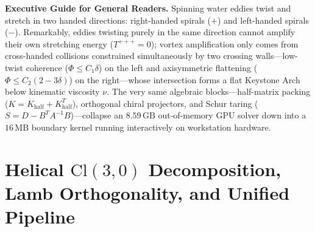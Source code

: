 \documentclass[10pt]{article}
\renewcommand{\_}{\OrigUnderscore\hspace{0pt}}
\numberwithin{equation}{section}
\newcommand{\Cl}{\mathrm{Cl}}
\begin{document}
\noindent\textbf{Executive Guide for General Readers.}
Spinning water eddies twist and stretch in two handed directions: right-handed spirals ($+$) and left-handed spirals ($-$). Remarkably, eddies twisting purely in the same direction cannot amplify their own stretching energy ($T^{+++} = 0$); vortex amplification only comes from cross-handed collisions constrained simultaneously by two crossing walls—low-twist coherence ($\Phi \le C_1\delta$) on the left and axisymmetric flattening ($\Phi \le C_2(2-3\delta)$) on the right—whose intersection forms a flat Keystone Arch below kinematic viscosity $\nu$. The very same algebraic blocks—half-matrix packing ($K = K_{\mathrm{half}} + K_{\mathrm{half}}^T$), orthogonal chiral projectors, and Schur taring ($S = D - B^T A^{-1} B$)—collapse an $8.59\,\mathrm{GB}$ out-of-memory GPU solver down into a $16\,\mathrm{MB}$ boundary kernel running interactively on workstation hardware.

\tableofcontents
\clearpage

\section{Helical \texorpdfstring{$\Cl(3,0)$}{Cl(3,0)} Decomposition, Lamb Orthogonality, and Unified Pipeline}\label{sec:ns-foundations}
\end{document}
